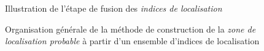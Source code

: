 \begin{figure}
  \centering
  
  \caption{Illustration de l'étape de fusion des \emph{indices de
      localisation}}
  \label{fig:ex_fus_inf}
\end{figure}


\begin{landscape}
  \begin{figure}[H]
    \centering
    
    \caption{Organisation générale de la méthode de construction de la
    \emph{zone de localisation probable} à partir d'un ensemble
    d'indices de localisation}
    \label{fig:methodo_1}
  \end{figure}
\end{landscape}


